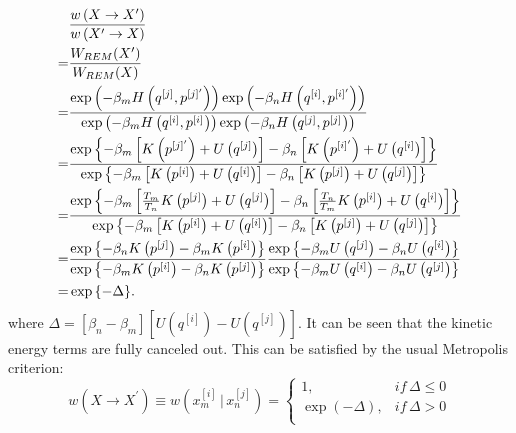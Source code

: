 \begin{align}
	&\frac{w\left(X\rightarrow X^\prime\right)}{w\left(X^\prime\rightarrow X\right)}\notag\\
	=&\frac{W_{REM}(X^\prime)}{W_{REM}(X)}\notag\\
	   =&\frac{\exp{\left(-\beta_m H\left(q^{[j]},p^{[j]^\prime}\right)\right)}\exp{\left(-\beta_n H\left(q^{[i]},p^{[i]^\prime}\right)\right)}}{\exp{\left(-\beta_m H\left(q^{[i]},p^{[i]^{ }}\right)\right)}\exp{\left(-\beta_n H\left(q^{[j]},p^{[j]^{ }}\right)\right)}}\notag\\
	   =&\frac{\exp{\left\{-\beta_m\left[K\left(p^{[j]^\prime}\right)+U\left(q^{[j]}\right)\right]-\beta_n\left[K\left(p^{[i]^\prime}\right)+U\left(q^{[i]}\right)\right]\notag\right\}}}
	   {\exp{\left\{-\beta_m\left[K\left(p^{[i]}\right)+U\left(q^{[i]}\right)\right]-\beta_n\left[K\left(p^{[j]}\right)+U\left(q^{[j]}\right)\right]\notag\right\}}}\notag\\
	   =&\frac{\exp{\left\{-\beta_m\left[\frac{T_m}{T_n}K\left(p^{[j]}\right)+U\left(q^{[j]}\right)\right]-\beta_n\left[\frac{T_n}{T_m}K\left(p^{[i]}\right)+U\left(q^{[i]}\right)\right]\notag\right\}}}
	   {\exp{\left\{-\beta_m\left[K\left(p^{[i]}\right)+U\left(q^{[i]}\right)\right]-\beta_n\left[K\left(p^{[j]}\right)+U\left(q^{[j]}\right)\right]\notag\right\}}}\notag\\
	   =&\dfrac{\exp{\left\{-\beta_n K\left(p^{[j]}\right)-\beta_m K\left(p^{[i]}\right)\right\}}}{\exp{\left\{-\beta_m K\left(p^{[i]}\right)-\beta_n K\left(p^{[j]}\right)\right\}}} \dfrac{\exp{\left\{-\beta_m U\left(q^{[j]}\right)-\beta_n U\left(q^{[i]}\right)\right\}}}{\exp{\left\{-\beta_m U\left(q^{[i]}\right)-\beta_n U\left(q^{[j]}\right)\right\}}}\notag\\
	   =&\exp{\left\{-\Delta\right\}}.
\end{align}
where $\Delta = \left[\beta_n-\beta_m\right]\left[U\left(q^{[i]}\right)-U\left(q^{[j]}\right)\right]$. It can be seen that the kinetic energy terms are fully canceled out.
This can be satisfied by the usual Metropolis criterion:
\begin{equation}
	w\left(X\rightarrow X^\prime\right)\equiv w\left(x_m^{[i]}\, \bigg\rvert\, x_n^{[j]}\right)= 
	\left\{ 
	\begin{array}{ll} 
		1, & if\, \Delta \leq 0\\ 
		\exp{(-\Delta)}, & if\, \Delta >0\\  
	\end{array} 
	\right. 
\end{equation}


